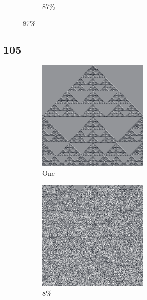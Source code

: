 \documentclass[12pt, fleqn]{report}                             %
\theoremstyle{break}                                            %
\begin{document}
\begin{figure}[ht!]
\begin{subfigure}[b]{0.4\linewidth}
          \caption{87\%}
        \end{subfigure}
      \end{figure}


      \clearpage
      \subsection{105}
      \begin{figure}[ht!]
        \centering
        \begin{subfigure}[b]{0.4\linewidth}
          \includegraphics[width=0.6\textwidth]{Images/105/a.png}
          \caption{One}
        \end{subfigure}
        \begin{subfigure}[b]{0.4\linewidth}
          \includegraphics[width=0.6\textwidth]{Images/105/b.png}
          \caption{8\%}
        \end{subfigure}
        \begin{subfigure}[b]{0.4\linewidth}

\end{subfigure}
\end{figure}
\end{document}
